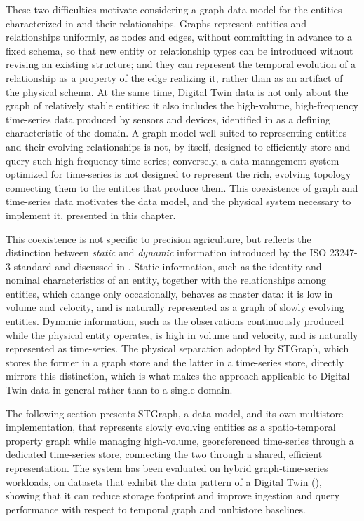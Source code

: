These two difficulties motivate considering a graph data model for the entities characterized in  and their relationships. Graphs represent entities and relationships uniformly, as nodes and edges, without committing in advance to a fixed schema, so that new entity or relationship types can be introduced without revising an existing structure; and they can represent the temporal evolution of a relationship as a property of the edge realizing it, rather than as an artifact of the physical schema. At the same time, Digital Twin data is not only about the graph of relatively stable entities: it also includes the high-volume, high-frequency time-series data produced by sensors and devices, identified in  as a defining characteristic of the domain. A graph model well suited to representing entities and their evolving relationships is not, by itself, designed to efficiently store and query such high-frequency time-series; conversely, a data management system optimized for time-series is not designed to represent the rich, evolving topology connecting them to the entities that produce them. This coexistence of graph and time-series data motivates the data model, and the physical system necessary to implement it, presented in this chapter.

This coexistence is not specific to precision agriculture, but reflects the distinction between \emph{static} and \emph{dynamic} information introduced by the ISO 23247-3 standard and discussed in . Static information, such as the identity and nominal characteristics of an entity, together with the relationships among entities, which change only occasionally, behaves as master data: it is low in volume and velocity, and is naturally represented as a graph of slowly evolving entities. Dynamic information, such as the observations continuously produced while the physical entity operates, is high in volume and velocity, and is naturally represented as time-series. The physical separation adopted by STGraph, which stores the former in a graph store and the latter in a time-series store, directly mirrors this distinction, which is what makes the approach applicable to Digital Twin data in general rather than to a single domain.

The following section presents STGraph, a data model, and its own multistore implementation, that represents slowly evolving entities as a spatio-temporal property graph while managing high-volume, georeferenced time-series through a dedicated time-series store, connecting the two through a shared, efficient representation.
%
The system has been evaluated on hybrid graph-time-series workloads, on datasets that exhibit the data pattern of a Digital Twin (), showing that it can reduce storage footprint and improve ingestion and query performance with respect to temporal graph and multistore baselines.


